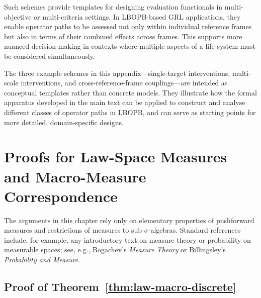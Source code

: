 \documentclass[11pt]{book}
\theoremstyle{plain}
\theoremstyle{definition}
\theoremstyle{remark}
\begin{document}
Such schemes provide templates for designing evaluation functionals in
multi-objective or multi-criteria settings. In LBOPB-based GRL
applications, they enable operator paths to be assessed not only
within individual reference frames but also in terms of their combined
effects across frames. This supports more nuanced decision-making in
contexts where multiple aspects of a life system must be considered
simultaneously.

The three example schemes in this appendix—single-target interventions,
multi-scale interventions, and cross-reference-frame couplings—are
intended as conceptual templates rather than concrete models. They
illustrate how the formal apparatus developed in the main text can be
applied to construct and analyse different classes of operator paths
in LBOPB, and can serve as starting points for more detailed,
domain-specific designs.

\chapter{Proofs for Law-Space Measures and Macro-Measure Correspondence}
\label{chap:law-macro-discrete-proofs}
The arguments in this chapter rely only on elementary properties of
pushforward measures and restrictions of measures to sub-$\sigma$-algebras.
Standard references include, for example, any introductory text on
measure theory or probability on measurable spaces; see, e.g.,
Bogachev's \emph{Measure Theory} or Billingsley's
\emph{Probability and Measure}.

\section{Proof of Theorem~\ref{thm:law-macro-discrete}}
\end{document}
